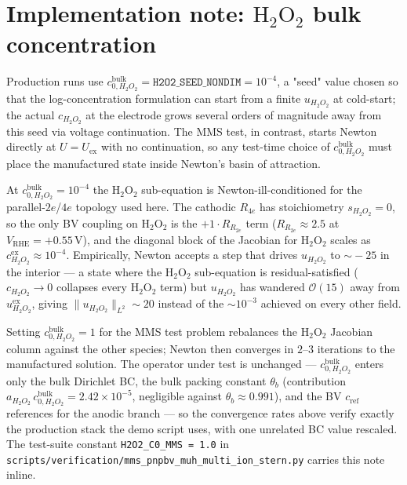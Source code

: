 \documentclass[11pt]{article}
\newcommand{\bulk}{\mathrm{bulk}}
\begin{document}
\section{Implementation note: $\mathrm{H_2O_2}$ bulk concentration}

Production runs use $c_{0,H_2O_2}^\bulk = \mathtt{H2O2\_SEED\_NONDIM} =
10^{-4}$, a "seed" value chosen so that the log-concentration
formulation can start from a finite $u_{H_2O_2}$ at cold-start; the
actual $c_{H_2O_2}$ at the electrode grows several orders of
magnitude away from this seed via voltage continuation. The MMS
test, in contrast, starts Newton directly at $U = U_\mathrm{ex}$ with
no continuation, so any test-time choice of $c_{0,H_2O_2}^\bulk$ must
place the manufactured state inside Newton's basin of attraction.

At $c_{0,H_2O_2}^\bulk = 10^{-4}$ the $\mathrm{H_2O_2}$ sub-equation
is Newton-ill-conditioned for the parallel-$2e$/$4e$ topology used
here. The cathodic $R_{4e}$ has stoichiometry $s_{H_2O_2} = 0$, so
the only BV coupling on $\mathrm{H_2O_2}$ is the $+1 \cdot R_{R_{2e}}$
term ($R_{R_{2e}}\approx 2.5$ at $V_\mathrm{RHE} = +0.55\,\mathrm{V}$),
and the diagonal block of the Jacobian for $\mathrm{H_2O_2}$ scales as
$c_{H_2O_2}^\mathrm{ex} \approx 10^{-4}$. Empirically, Newton accepts a
step that drives $u_{H_2O_2}$ to $\sim\!-25$ in the interior --- a
state where the $\mathrm{H_2O_2}$ sub-equation is residual-satisfied
($c_{H_2O_2} \to 0$ collapses every $\mathrm{H_2O_2}$ term) but
$u_{H_2O_2}$ has wandered $\mathcal{O}(15)$ away from
$u_{H_2O_2}^\mathrm{ex}$, giving $\lVert u_{H_2O_2} \rVert_{L^2} \sim
20$ instead of the $\sim\!10^{-3}$ achieved on every other field.

Setting $c_{0,H_2O_2}^\bulk = 1$ for the MMS test problem rebalances
the $\mathrm{H_2O_2}$ Jacobian column against the other species; Newton
then converges in $2$--$3$ iterations to the manufactured solution.
The operator under test is unchanged --- $c_{0,H_2O_2}^\bulk$ enters
only the bulk Dirichlet BC, the bulk packing constant $\theta_b$
(contribution $a_{H_2O_2}\, c_{0,H_2O_2}^\bulk = 2.42\times 10^{-5}$,
negligible against $\theta_b \approx 0.991$), and the BV $c_\mathrm{ref}$
references for the anodic branch --- so the convergence rates above
verify exactly the production stack the demo script uses, with one
unrelated BC value rescaled. The test-suite constant
\verb|H2O2_C0_MMS = 1.0| in
\verb|scripts/verification/mms_pnpbv_muh_multi_ion_stern.py| carries
this note inline.
\end{document}

